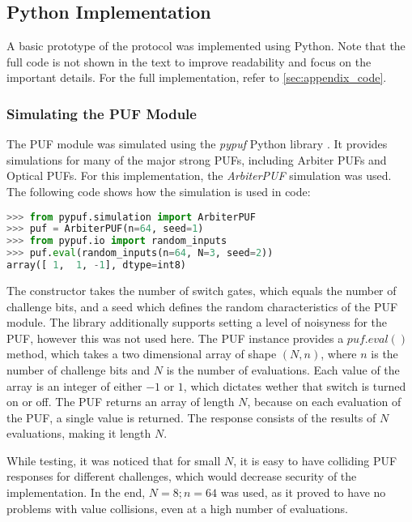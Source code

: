 \subsection{Python Implementation}
\label{sec:imp_solution}

A basic prototype of the protocol was implemented using Python.
Note that the full code is not shown in the text to improve readability and focus
on the important details. For the full implementation, refer to \ref{sec:appendix_code}.

\subsubsection{Simulating the PUF Module}

The PUF module was simulated using the \emph{pypuf} Python library \cite{pypuf}.
It provides simulations for many of the major strong PUFs, including Arbiter PUFs and Optical PUFs.
For this implementation, the \emph{ArbiterPUF} simulation was used.
The following code shows how the simulation is used in code:
\begin{lstlisting}[language=Python]
>>> from pypuf.simulation import ArbiterPUF
>>> puf = ArbiterPUF(n=64, seed=1)
>>> from pypuf.io import random_inputs
>>> puf.eval(random_inputs(n=64, N=3, seed=2))
array([ 1,  1, -1], dtype=int8)
\end{lstlisting}

The constructor takes the number of switch gates, which equals the number of challenge bits, and a seed
which defines the random characteristics of the PUF module.
The library additionally supports setting a level of noisyness for the PUF, however this was not used here.
The PUF instance provides a $puf.eval()$ method, which takes a two dimensional array of shape $(N, n)$,
where $n$ is the number of challenge bits and $N$ is the number of evaluations.
Each value of the array is an integer  of either $-1$ or $1$, which dictates wether that switch is turned on or off.
The PUF returns an array of length $N$, because on each evaluation of the PUF, a single value is returned.
The response consists of the results of $N$ evaluations, making it length $N$.

While testing, it was noticed that for small $N$, it is easy to have colliding PUF responses for different challenges,
which would decrease security of the implementation.
In the end, $N = 8; n = 64$ was used, as it proved to have no problems with value collisions, even at a high
number of evaluations.

